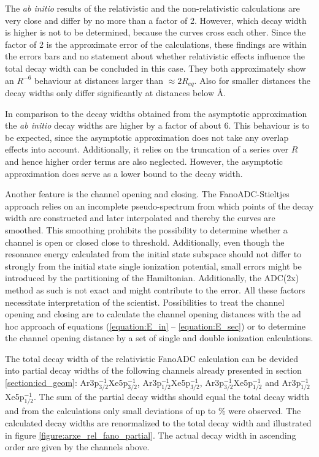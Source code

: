 The \textit{ab initio} results of the relativistic and the non-relativistic
calculations are very close and differ by no more than a factor of 2.
However, which decay width is higher is not to be determined, because the
curves cross each other.
Since the factor of 2 is the approximate error of the calculations,
these findings are within the errors bars and no statement
about whether relativistic effects influence the total decay width can be
concluded in this case.
They both approximately show an $R^{-6}$ behaviour at distances larger than
$\approx 2R_{eq}$. Also for smaller distances the decay widths only differ
significantly at distances below \unit[5]{\AA}.

In comparison to the decay widths obtained from the asymptotic approximation the
\textit{ab initio} decay widths are higher by a factor of about 6. This behaviour
is to be expected, since the asymptotic approximation does not take any overlap
effects into account. Additionally, it relies on the truncation of a series over
$R$ and hence higher order terms are also neglected. However, the asymptotic
approximation does serve as a lower bound to the decay width.

Another feature is the channel opening and closing. The FanoADC-Stieltjes
approach relies on an incomplete pseudo-spectrum from which points of the
decay width are constructed and later interpolated and thereby the curves are
smoothed. This smoothing prohibits the possibility to determine whether a channel
is open or closed close to threshold. Additionally, even though the resonance energy
calculated from the initial state subspace should not differ to strongly from the
initial state single ionization potential, small errors might be introduced by
the partitioning of the Hamiltonian. Additionally, the \ac{ADC}(2x) method as such
is not exact and might contribute to the error. All these factors necessitate
interpretation of the scientist.
Possibilities to treat the channel opening and closing are to calculate the
channel opening distances with the ad hoc approach of equations (\ref{equation:E_in}
-- \ref{equation:E_sec}) or to determine the channel opening distance by a set of
single and double ionization calculations.


The total decay width of the relativistic FanoADC calculation can be devided
into partial decay widths of the following channels already presented in
section \ref{section:icd_geom}: Ar3p$_{3/2}^{-1}$Xe5p$_{3/2}^{-1}$,
Ar3p$_{1/2}^{-1}$Xe5p$_{3/2}^{-1}$, Ar3p$_{3/2}^{-1}$Xe5p$_{1/2}^{-1}$ and
Ar3p$_{1/2}^{-1}$Xe5p$_{1/2}^{-1}$. The sum of the partial decay widths should
equal the total decay width and from the calculations only small deviations
of up to \unit[10]{\%} were observed. The calculated decay widths are renormalized
to the total decay width and illustrated in
figure \ref{figure:arxe_rel_fano_partial}. The actual decay width in ascending
order are given by the channels above.

